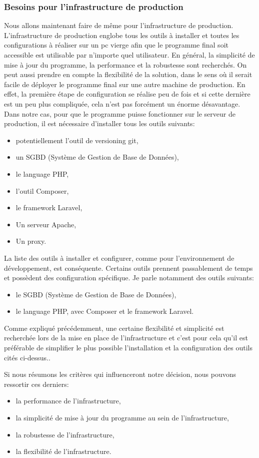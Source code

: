 \documentclass[
    iai, %
    il, %
]{heig-tb}
\begin{document}
\subsubsection{Besoins pour l'infrastructure de production}
Nous allons maintenant faire de même pour l'infrastructure de production.
L'infrastructure de production englobe tous les outils à installer et toutes les configurations à réaliser sur un pc vierge afin que le programme final soit accessible est utilisable par n'importe quel utilisateur.
En général, la simplicité de mise à jour du programme, la performance et la robustesse sont recherchés.
On peut aussi prendre en compte la flexibilité de la solution, dans le sens où il serait facile de déployer le programme final sur une autre machine de production.
En effet, la première étape de configuration se réalise peu de fois et si cette dernière est un peu plus compliquée, cela n'est pas forcément un énorme désavantage.
Dans notre cas, pour que le programme puisse fonctionner sur le serveur de production, il est nécessaire d'installer tous les outils suivants:
\begin{itemize}
    \item potentiellement l'outil de versioning git,
    \item un SGBD (Système de Gestion de Base de Données),
    \item le language PHP,
    \item l'outil Composer,
    \item le framework Laravel,
    \item Un serveur Apache,
    \item Un proxy.
\end{itemize}
La liste des outils à installer et configurer, comme pour l'environnement de développement, est conséquente.
Certains outils prennent passablement de temps et possèdent des configuration spécifique.
Je parle notamment des outils suivants:
\begin{itemize}
    \item le SGBD (Système de Gestion de Base de Données),
    \item le language PHP, avec Composer et le framework Laravel.
\end{itemize}
Comme expliqué précédemment, une certaine flexibilité et simplicité est recherchée lors de la mise en place de l'infrastructure et c'est pour cela qu'il est préférable de simplifier le plus possible l'installation et la configuration des outils cités ci-dessus..

Si nous résumons les critères qui influenceront notre décision, nous pouvons ressortir ces derniers:
\begin{itemize}
    \item la performance de l'infrastructure,
    \item la simplicité de mise à jour du programme au sein de l'infrastructure,
    \item la robustesse de l'infrastructure,
    \item la flexibilité de l'infrastructure.
\end{itemize}
\end{document}
